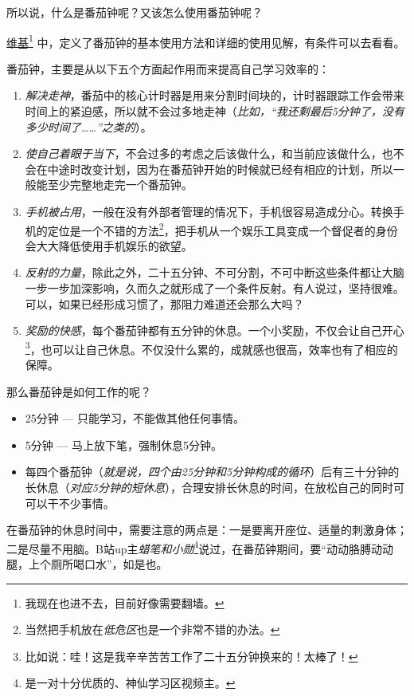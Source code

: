 \documentclass[b5paper]{ctexart}
\begin{document}
			所以说，什么是番茄钟呢？又该怎么使用番茄钟呢？

			\href{https://zh.wikipedia.org/zh-hans/%E7%95%AA%E8%8C%84%E5%B7%A5%E4%BD%9C%E6%B3%95}{维基}\footnote{我现在也进不去，目前好像需要翻墙。}%
			中，定义了番茄钟的基本使用方法和详细的使用见解，有条件可以去看看。

			番茄钟，主要是从以下五个方面起作用而来提高自己学习效率的：
			
			\begin{enumerate}
				\item \emph{解决走神}，番茄中的核心计时器是用来分割时间块的，计时器跟踪工作会带来时间上的紧迫感，所以就不会过多地走神（\emph{比如，``我还剩最后5分钟了，没有多少时间了\ldots\ldots ''之类的}）。
				\item \emph{使自己着眼于当下}，不会过多的考虑之后该做什么，和当前应该做什么，也不会在中途时改变计划，因为在番茄钟开始的时候就已经有相应的计划，所以一般能至少完整地走完一个番茄钟。
				\item \emph{手机被占用}，一般在没有外部者管理的情况下，手机很容易造成分心。转换手机的定位是一个不错的方法\footnote{当然把手机放在\emph{低危区}也是一个非常不错的办法。}，把手机从一个娱乐工具变成一个督促者的身份会大大降低使用手机娱乐的欲望。
				\item \emph{反射的力量}，除此之外，二十五分钟、不可分割，不可中断这些条件都让大脑一步一步加深影响，久而久之就形成了一个条件反射。有人说过，坚持很难。可以，如果已经形成习惯了，那阻力难道还会那么大吗？
				\item \emph{奖励的快感}，每个番茄钟都有五分钟的休息。一个小奖励，不仅会让自己开心\footnote{比如说：哇！这是我辛辛苦苦工作了二十五分钟换来的！太棒了！}，也可以让自己休息。不仅没什么累的，成就感也很高，效率也有了相应的保障。
			\end{enumerate}

			那么番茄钟是如何工作的呢？
			\begin{itemize}
				\item 25分钟 --- 只能学习，不能做其他任何事情。
				\item 5分钟 --- 马上放下笔，强制休息5分钟。
				\item 每四个番茄钟（\emph{就是说，四个由25分钟和5分钟构成的循环}）后有三十分钟的长休息（\emph{对应5分钟的短休息}），合理安排长休息的时间，在放松自己的同时可可以干不少事情。 
			\end{itemize}

			在番茄钟的休息时间中，需要注意的两点是：一是要离开座位、适量的刺激身体；二是尽量不用脑。B站up主\emph{蜡笔和小勋}\footnote{是一对十分优质的、神仙学习区视频主。}说过，在番茄钟期间，要``动动胳膊动动腿，上个厕所喝口水''，如是也。
\end{document}

